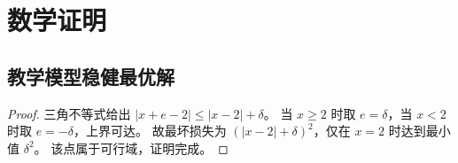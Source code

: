 \section{数学证明}\label{app:proof}
\subsection{教学模型稳健最优解}
\begin{proof}
三角不等式给出 $|x+e-2|\leq|x-2|+\delta$。
当 $x\geq2$ 时取 $e=\delta$，当 $x<2$ 时取 $e=-\delta$，上界可达。
故最坏损失为 $(|x-2|+\delta)^2$，仅在 $x=2$ 时达到最小值 $\delta^2$。
该点属于可行域，证明完成。
\end{proof}
